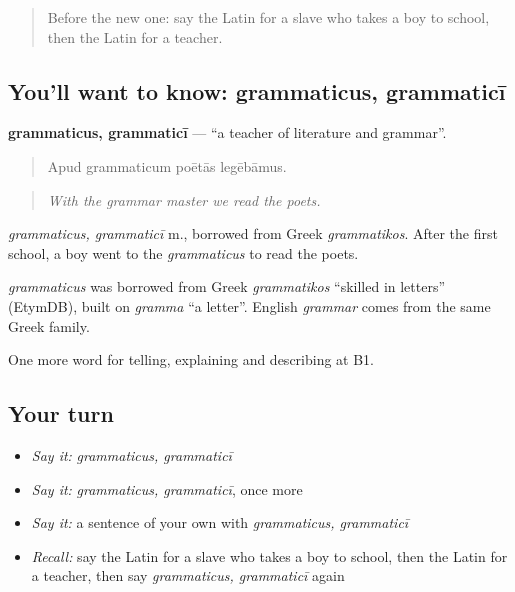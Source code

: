 \begin{quote}
Before the new one: say the Latin for a slave who takes a boy to school, then the Latin for a teacher.
\end{quote}

\subsection*{You'll want to know: grammaticus, grammaticī}
\textbf{grammaticus, grammaticī} — \textquotedblleft{}a teacher of literature and grammar\textquotedblright{}.

\begin{quote}
Apud grammaticum poētās legēbāmus.
\end{quote}

\begin{quote}
\emph{With the grammar master we read the poets.}
\end{quote}

\emph{grammaticus, grammaticī} m., borrowed from Greek \emph{grammatikos}. After the first school, a boy went to the \emph{grammaticus} to read the poets.

\begin{cousinweb}
\emph{grammaticus} was borrowed from Greek \emph{grammatikos} \textquotedblleft{}skilled in letters\textquotedblright{} (EtymDB), built on \emph{gramma} \textquotedblleft{}a letter\textquotedblright{}. English \emph{grammar} comes from the same Greek family.
\end{cousinweb}

\begin{grammarlens}[title={What you've built}]
One more word for telling, explaining and describing at B1.
\end{grammarlens}

\subsection*{Your turn}
\begin{itemize}
\raggedright
  \item \emph{Say it:} \emph{grammaticus, grammaticī}
  \item \emph{Say it:} \emph{grammaticus, grammaticī}, once more
  \item \emph{Say it:} a sentence of your own with \emph{grammaticus, grammaticī}
  \item \emph{Recall:} say the Latin for a slave who takes a boy to school, then the Latin for a teacher, then say \emph{grammaticus, grammaticī} again
\end{itemize}

